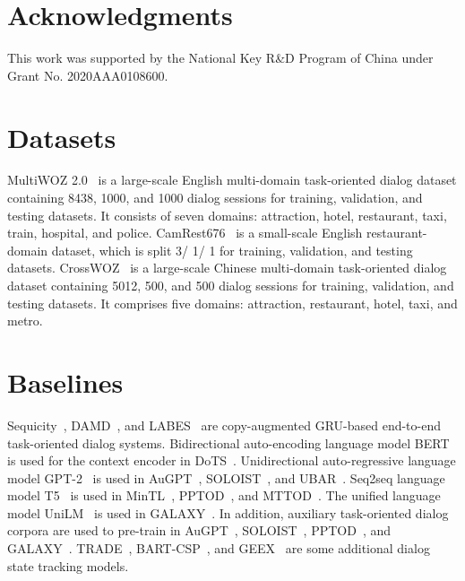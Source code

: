 \section*{Acknowledgments}
This work was supported by the National Key R\&D Program of China under Grant No. 2020AAA0108600.

\appendix
\section{Datasets}
\label{sec:dataset}
MultiWOZ 2.0~\cite{budzianowski-etal-2018-multiwoz} is a large-scale English multi-domain task-oriented dialog dataset containing 8438, 1000, and 1000 dialog sessions for training, validation, and testing datasets. It consists of seven domains: attraction, hotel, restaurant, taxi,  train, hospital, and police. 
CamRest676~\cite{wen-etal-2017-network} is a small-scale English restaurant-domain  dataset, which  is split 3/ 1/ 1 for training, validation, and testing datasets. CrossWOZ~\cite{zhu-etal-2020-crosswoz} is a large-scale Chinese multi-domain task-oriented dialog dataset containing  5012, 500, and 500 dialog sessions for training, validation, and testing datasets. It comprises five domains: attraction, restaurant, hotel, taxi, and metro. 
\section{Baselines}
\label{sec:baseline}

Sequicity~\cite{lei-etal-2018-sequicity}, DAMD~\cite{DBLP:conf/aaai/ZhangOY20}, and LABES~\cite{zhang-etal-2020-probabilistic} are copy-augmented GRU-based end-to-end task-oriented dialog systems.
Bidirectional auto-encoding language model BERT~\cite{devlin-etal-2019-bert} is used for the context encoder in DoTS~\cite{DBLP:journals/corr/abs-2103-06648}.
Unidirectional auto-regressive language model GPT-2~\cite{radford2019language} is used in AuGPT~\cite{DBLP:journals/corr/abs-2102-05126},  SOLOIST~\cite{peng2020soloist}, and UBAR~\cite{DBLP:conf/aaai/YangLQ21}. 
Seq2seq language model T5~\cite{2020t5} is used in MinTL~\cite{lin-etal-2020-mintl}, PPTOD~\cite{DBLP:journals/corr/abs-2109-14739},  and MTTOD~\cite{lee-2021-improving-end}. The unified language model UniLM~\cite{DBLP:conf/nips/00040WWLWGZH19} is used in GALAXY~\cite{DBLP:journals/corr/abs-2111-14592}. In addition, auxiliary task-oriented dialog corpora are used to pre-train in AuGPT~\cite{DBLP:journals/corr/abs-2102-05126}, SOLOIST~\cite{peng2020soloist}, PPTOD~\cite{DBLP:journals/corr/abs-2109-14739}, and  GALAXY~\cite{DBLP:journals/corr/abs-2111-14592}.
TRADE~\cite{wu-etal-2019-transferable}, BART-CSP~\cite{DBLP:journals/corr/abs-2111-02574}, and GEEX~\cite{li-etal-2021-generation} are some additional dialog state tracking models. 

